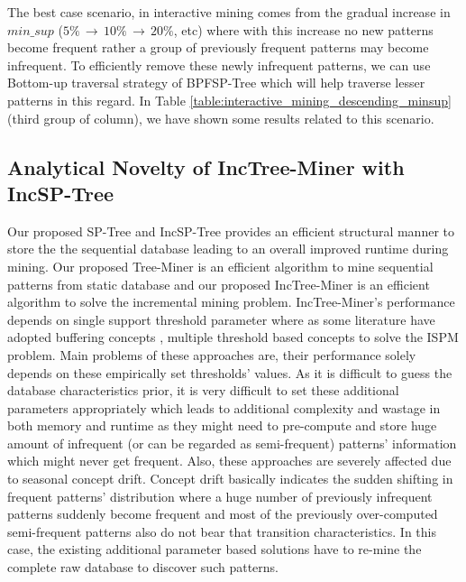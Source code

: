 The best case scenario, in interactive mining comes from the gradual increase in $min\_sup$ ($5\% \,\to\, 10\% \,\to\, 20\% $, etc) where with this increase no new patterns become frequent rather a group of previously frequent patterns may become infrequent. To efficiently remove these newly infrequent patterns, we can use Bottom-up traversal strategy of BPFSP-Tree which will help traverse lesser patterns in this regard. In Table \ref{table:interactive_mining_descending_minsup}(third group of column), we have shown some results related to this scenario.





\subsection{Analytical Novelty of IncTree-Miner with IncSP-Tree}
Our proposed SP-Tree and IncSP-Tree provides an efficient structural manner to store the the sequential database leading to an overall improved runtime during mining. Our proposed Tree-Miner is an efficient algorithm to mine sequential patterns from static database and our proposed IncTree-Miner is an efficient algorithm to solve the incremental mining problem. IncTree-Miner's performance depends on single support threshold parameter where as some literature have adopted buffering concepts \cite{cheng2004incspan}, multiple threshold based concepts \cite{lin2015incrementally} to solve the ISPM problem. Main problems of these approaches are, their performance solely depends on these empirically set thresholds' values. As it is difficult to guess the database characteristics prior, it is very difficult to set these additional parameters appropriately which leads to additional complexity and wastage in both memory and runtime as they might need to pre-compute and store huge amount of infrequent (or can be regarded as semi-frequent) patterns' information which might never get frequent. Also, these approaches are severely affected due to seasonal concept drift. Concept drift basically indicates the sudden shifting in frequent patterns' distribution where a huge number of previously infrequent patterns suddenly become frequent and most of the previously over-computed semi-frequent patterns also do not bear that transition characteristics. In this case, the existing additional parameter based solutions have to re-mine the complete raw database to discover such patterns.

